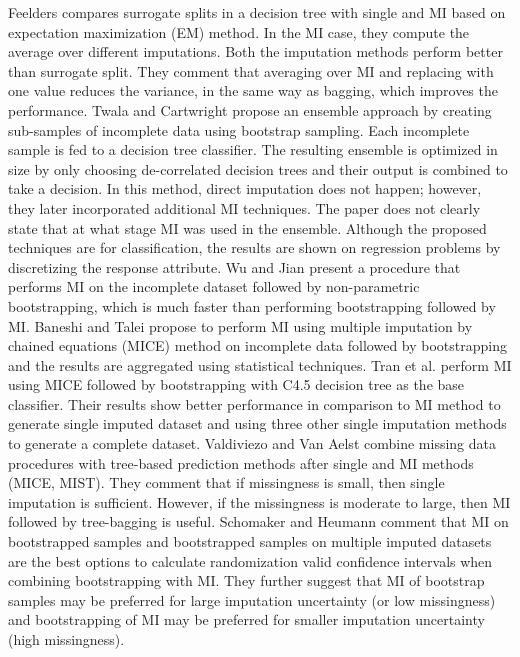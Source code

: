 \documentclass{iosart2c}
\begin{document}
 Feelders \cite{feelders1999handling} compares surrogate splits in a decision tree with single and MI based on expectation maximization (EM) method. In the MI case, they compute the average over different imputations. Both the imputation methods perform better than surrogate split. They comment that averaging over MI and replacing with one value reduces the variance, in the same way as bagging, which improves the performance. 
Twala and Cartwright \cite{twala2010ensemble} propose an ensemble approach by creating sub-samples of incomplete data using bootstrap sampling. Each incomplete sample is fed to a decision tree classifier. The resulting ensemble is optimized in size by only choosing de-correlated decision trees and their output is combined to take a decision. In this method, direct imputation does not happen; however, they later incorporated additional MI techniques. The paper does not clearly state that at what stage MI was used in the ensemble. Although the proposed techniques are for classification, the results are shown on regression problems by discretizing the response attribute.
Wu and Jian \cite{wu2013new} present a procedure that performs MI on the incomplete dataset followed by non-parametric bootstrapping, which is much faster than performing bootstrapping followed by MI. Baneshi and Talei \cite{baneshi2012assessment} propose to perform MI using multiple imputation by chained equations (MICE) method on incomplete data followed by bootstrapping and the results are aggregated using statistical techniques. Tran et al. \cite{tran2017multiple} perform MI using MICE followed by bootstrapping with C4.5 decision tree as the base classifier. Their results show better performance in comparison to MI method to generate single imputed dataset and using three other single imputation methods to generate a complete dataset.
Valdiviezo and Van Aelst \cite{valdiviezo2015tree} combine missing data procedures with tree-based prediction methods after single and MI methods (MICE, MIST). They comment that if missingness is small, then single imputation is sufficient. However, if the missingness is moderate to large, then MI followed by tree-bagging is useful. 
Schomaker and Heumann \cite{schomaker2016bootstrap} comment that MI on bootstrapped samples and bootstrapped samples on multiple imputed datasets are the best options to calculate randomization valid confidence intervals when combining bootstrapping with MI. They further suggest that MI of bootstrap samples may be preferred for large imputation uncertainty (or low missingness) and bootstrapping of MI may be preferred for smaller imputation uncertainty (high missingness).
\end{document}
